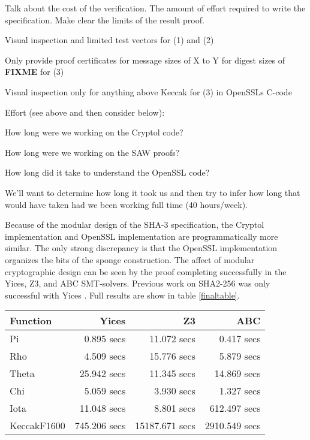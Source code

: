 Talk about the cost of the verification. The amount of effort required to write the specification. Make clear the limits of the result proof.

\begin{compactitem}
\item Visual inspection and limited test vectors for (1) and (2)
\item Only provide proof certificates for message sizes of X to Y for digest sizes of \textbf{FIXME} for (3)
\item Visual inspection only for anything above Keccak for (3) in OpenSSLs C-code
\end{compactitem}

Effort (see above and then consider below):
\begin{compactitem}
 \item How long were we working on the Cryptol code?
 \item How long were we working on the SAW proofs?
 \item How long did it take to understand the OpenSSL code?
\end{compactitem}
We'll want to determine how long it took us and then try to infer how long that would have taken had we been working full time (40 hours/week).

Because of the modular design of the SHA-3 specification, the Cryptol implementation and OpenSSL implementation are programmatically more similar. 
The only strong discrepancy is that the OpenSSL implementation organizes the bits of the sponge construction. 
The affect of modular cryptographic design can be seen by the proof completing successfully in the Yices, Z3, and ABC SMT-solvers. 
Previous work on SHA2-256 was only successful with Yices \cite{nfm-us}. Full results are show in table \ref{finaltable}. 

\begin{table*}[b]
\caption{Proof Runtimes for SHA-3 with SMT-solvers}\label{finaltable}
\setlength{\tabcolsep}{13.5pt}
\begin{tabular}{|l|r|r|r|}
\hline
\textbf{Function} & \textbf{Yices} & \textbf{Z3} & \textbf{ABC} \\
\hline
Pi          &   0.895 secs &    11.072 secs &    0.417 secs \\
Rho         &   4.509 secs &    15.776 secs &    5.879 secs \\
Theta       &  25.942 secs &    11.345 secs &   14.869 secs \\
Chi         &   5.059 secs &     3.930 secs &    1.327 secs \\
Iota        &  11.048 secs &     8.801 secs &  612.497 secs \\
KeccakF1600 & 745.206 secs & 15187.671 secs & 2910.549 secs \\
\hline
\end{tabular}
\end{table*}